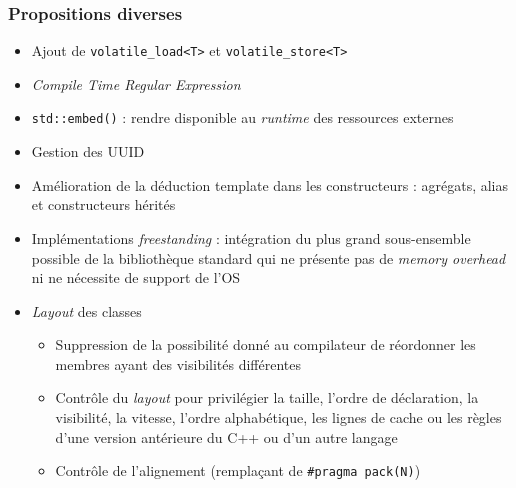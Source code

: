 \documentclass[C++.tex]{subfiles}
\begin{document}
\begin{frame}[fragile]
	\frametitle{Propositions diverses}
	\begin{itemize}
		\item Ajout de \lstinline|volatile_load<T>| et \lstinline|volatile_store<T>|
		\item \textit{Compile Time Regular Expression}
		\item \lstinline|std::embed()| : rendre disponible au \textit{runtime} des ressources externes


		\item Gestion des UUID
		\item Amélioration de la déduction template dans les constructeurs : agrégats, alias et constructeurs hérités


		\item Implémentations \textit{freestanding} : intégration du plus grand sous-ensemble possible de la bibliothèque standard qui ne présente pas de \textit{memory overhead} ni ne nécessite de support de l'OS


		\item \textit{Layout} des classes
		\begin{itemize}
			\item Suppression de la possibilité donné au compilateur de réordonner les membres ayant des visibilités différentes


			\item Contrôle du \textit{layout} pour privilégier la taille, l'ordre de déclaration, la visibilité, la vitesse, l'ordre alphabétique, les lignes de cache ou les règles d'une version antérieure du C++ ou d'un autre langage
			\item Contrôle de l'alignement (remplaçant de \lstinline|#pragma pack(N)|)
		\end{itemize}

	\end{itemize}
\end{frame}
\end{document}
